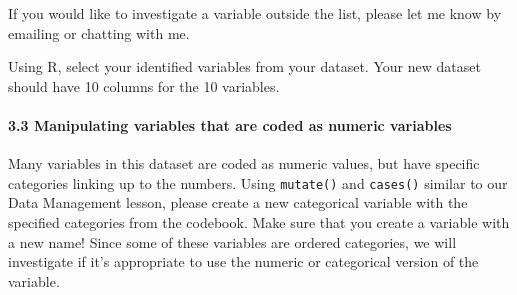 \documentclass[
  letterpaper,
  DIV=11,
  numbers=noendperiod]{scrartcl}
\let\oldparagraph\paragraph
\renewcommand{\paragraph}[1]{\oldparagraph{#1}\mbox{}}
\begin{document}
If you would like to investigate a variable outside the list, please let
me know by emailing or chatting with me.

\begin{tcolorbox}[enhanced jigsaw, coltitle=black, bottomrule=.15mm, opacityback=0, arc=.35mm, toprule=.15mm, colbacktitle=quarto-callout-important-color!10!white, left=2mm, colback=white, opacitybacktitle=0.6, colframe=quarto-callout-important-color-frame, rightrule=.15mm, leftrule=.75mm, breakable, bottomtitle=1mm, titlerule=0mm, toptitle=1mm, title=\textcolor{quarto-callout-important-color}{\faExclamation}\hspace{0.5em}{Task}]

Using R, select your identified variables from your dataset. Your new
dataset should have 10 columns for the 10 variables.

\end{tcolorbox}

\hypertarget{manipulating-variables-that-are-coded-as-numeric-variables}{%
\paragraph{3.3 Manipulating variables that are coded as numeric
variables}\label{manipulating-variables-that-are-coded-as-numeric-variables}}

Many variables in this dataset are coded as numeric values, but have
specific categories linking up to the numbers. Using \texttt{mutate()}
and \texttt{cases()} similar to our Data Management lesson, please
create a new categorical variable with the specified categories from the
codebook. Make sure that you create a variable with a new name! Since
some of these variables are ordered categories, we will investigate if
it's appropriate to use the numeric or categorical version of the
variable.
\end{document}
